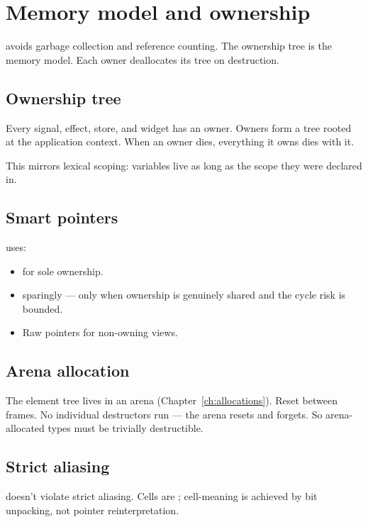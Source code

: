 \chapter{Memory model and ownership}
\label{ch:memory}

\begin{aside}
\maya{} avoids garbage collection and reference counting. The
ownership tree is the memory model. Each owner deallocates
its tree on destruction.
\end{aside}

\section{Ownership tree}

Every signal, effect, store, and widget has an owner. Owners
form a tree rooted at the application context. When an owner
dies, everything it owns dies with it.

This mirrors lexical scoping: variables live as long as the
scope they were declared in.

\section{Smart pointers}

\maya{} uses:

\begin{itemize}[leftmargin=*]
  \item {} for sole ownership.
  \item {} sparingly --- only when ownership
    is genuinely shared and the cycle risk is bounded.
  \item Raw pointers for non-owning views.
\end{itemize}

\section{Arena allocation}

The element tree lives in an arena (Chapter~\ref{ch:allocations}).
Reset between frames. No individual destructors run --- the
arena resets and forgets. So arena-allocated types must be
trivially destructible.

\section{Strict aliasing}

\maya{} doesn't violate strict aliasing. Cells are
; cell-meaning is achieved by bit unpacking,
not pointer reinterpretation.

